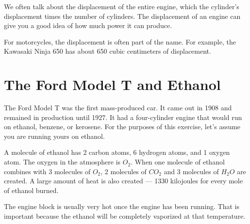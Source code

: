 We often talk about the displacement of the entire engine, which the
 cylinder's displacement times the number of cylinders. The displacement of an engine can give you a
 good idea of how much power it can produce.
 
For motorcycles, the displacement is often part of the name. For example, the Kawasaki Ninja 650 has about 650 cubic centimeters of displacement. 

\section{The Ford Model T and Ethanol}

The Ford Model T was the first mass-produced car. It came out in 1908 and remained in production until 1927. It had a four-cylinder engine that would run on ethanol, benzene, or kerosene. For the purposes of this exercise, let's assume you are running yours on ethanol.

A molecule of ethanol has 2 carbon atoms, 6 hydrogen atoms, and 1 oxygen atom. The oxygen in the atmosphere is $O_2$.  When one molecule of ethanol combines with 3 molecules of $O_2$, 2 molecules of $CO_2$ and 3 molecules of $H_2O$ are created. A large amount of heat is also created --- 1330 kilojoules for every mole of ethanol burned.

The engine block is usually very hot once the engine has been running. That is important because the ethanol will be completely vaporized at that temperature.

